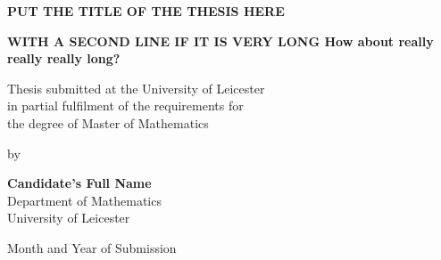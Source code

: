 \vspace*{2in}


\begin{center}
\textbf{\large{}PUT THE TITLE OF THE THESIS HERE}
\par\end{center}{\large \par}

\begin{center}
\textbf{\large{}WITH A SECOND LINE IF IT IS VERY LONG How about really
really really long?}
\par\end{center}{\large \par}

\vspace{1.2in}


\begin{singlespace}
\noindent \begin{center}
Thesis submitted at the University of Leicester \\
 in partial fulfilment of the requirements for \\
 the degree of Master of Mathematics 
\par\end{center}
\end{singlespace}

\vspace{0.5in}


\begin{center}
by 
\par\end{center}

\vspace{0.5in}


\begin{singlespace}
\noindent \begin{center}
\textbf{Candidate's Full Name} \\
Department of Mathematics \\
University of Leicester 
\par\end{center}
\end{singlespace}

\vspace{0.5in}


\begin{center}
Month and Year of Submission 
\par\end{center}
